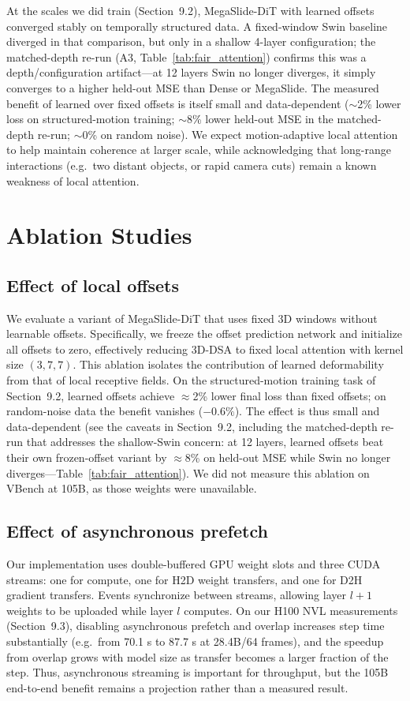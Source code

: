 \documentclass[11pt, letterpaper]{article}
\begin{document}
At the scales we did train (Section~9.2), MegaSlide-DiT with learned offsets converged stably on temporally structured data. A fixed-window Swin baseline diverged in that comparison, but only in a shallow 4-layer configuration; the matched-depth re-run (A3, Table~\ref{tab:fair_attention}) confirms this was a depth/configuration artifact---at 12 layers Swin no longer diverges, it simply converges to a higher held-out MSE than Dense or MegaSlide. The measured benefit of learned over fixed offsets is itself small and data-dependent ($\sim$2\% lower loss on structured-motion training; $\sim$8\% lower held-out MSE in the matched-depth re-run; $\sim$0\% on random noise). We expect motion-adaptive local attention to help maintain coherence at larger scale, while acknowledging that long-range interactions (e.g.\ two distant objects, or rapid camera cuts) remain a known weakness of local attention.


\section{Ablation Studies}

\subsection{Effect of local offsets}
We evaluate a variant of MegaSlide-DiT that uses fixed 3D windows without learnable offsets. Specifically, we freeze the offset prediction network and initialize all offsets to zero, effectively reducing 3D-DSA to fixed local attention with kernel size $(3, 7, 7)$. This ablation isolates the contribution of learned deformability from that of local receptive fields. On the structured-motion training task of Section~9.2, learned offsets achieve $\approx$2\% lower final loss than fixed offsets; on random-noise data the benefit vanishes ($-0.6\%$). The effect is thus small and data-dependent (see the caveats in Section~9.2, including the matched-depth re-run that addresses the shallow-Swin concern: at 12 layers, learned offsets beat their own frozen-offset variant by $\approx$8\% on held-out MSE while Swin no longer diverges---Table~\ref{tab:fair_attention}). We did not measure this ablation on VBench at 105B, as those weights were unavailable.

\subsection{Effect of asynchronous prefetch}
Our implementation uses double-buffered GPU weight slots and three CUDA streams: one for compute, one for H2D weight transfers, and one for D2H gradient transfers. Events synchronize between streams, allowing layer $l+1$ weights to be uploaded while layer $l$ computes. On our H100 NVL measurements (Section~9.3), disabling asynchronous prefetch and overlap increases step time substantially (e.g.\ from 70.1 s to 87.7 s at 28.4B/64 frames), and the speedup from overlap grows with model size as transfer becomes a larger fraction of the step. Thus, asynchronous streaming is important for throughput, but the 105B end-to-end benefit remains a projection rather than a measured result.
\end{document}
